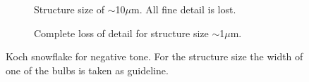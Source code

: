 \begin{figure}[htb]
\begin{subfigure}[t]{0.32\linewidth}
  	\caption{Structure size of $\sim$10$\mu$m. All fine detail is lost.}
  	\label{fig:b2d36_q37}
 \end{subfigure}
 \hfill
     \begin{subfigure}[t]{0.32\linewidth}
  	\centering
  	\caption{Complete loss of detail for structure size $\sim$1$\mu$m.}
  	\label{fig:b2d38_q38}
 \end{subfigure}
\caption{Koch snowflake for negative tone. For the structure size the width of one of the bulbs is taken as guideline.}
  \end{figure}





